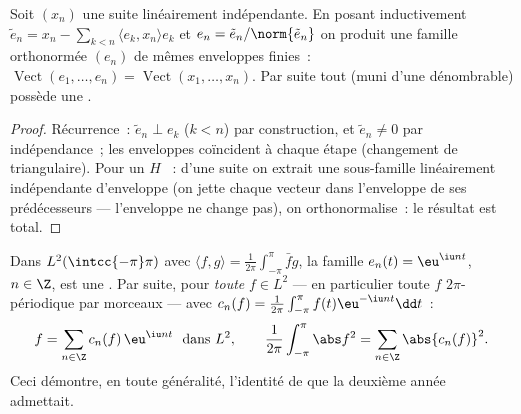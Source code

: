 \begin{proposition}\label{prop:b3:hilbert:gramschmidt}
Soit $(x_n)$ une suite linéairement indépendante. En posant
inductivement $\tilde e_n = x_n - \sum_{k<n}\langle e_k,
x_n\rangle e_k$ et $e_n = \tilde e_n/\norm{\tilde e_n}$ on
produit une famille orthonormée $(e_n)$ de mêmes enveloppes
finies~: $\operatorname{Vect}(e_1, \dots, e_n) =
\operatorname{Vect}(x_1, \dots, x_n)$. Par suite tout   (muni d'une  dénombrable)
possède une .
\end{proposition}

\begin{proof}
Récurrence~: $\tilde e_n \perp e_k$ ($k < n$) par
construction, et $\tilde e_n \neq 0$ par indépendance~; les
enveloppes coïncident à chaque étape (changement de 
triangulaire). Pour un $H$ ~: d'une suite  on
extrait une sous-famille linéairement indépendante d'enveloppe
 (on jette chaque vecteur dans l'enveloppe de ses
prédécesseurs --- l'enveloppe ne change pas), on
orthonormalise~: le résultat est total.
\end{proof}

\begin{theorem}
\label{thm:b3:hilbert:fourier}
Dans $L^2(\intcc{-\pi}\pi)$ avec $\langle f, g\rangle =
\frac1{2\pi}\int_{-\pi}^\pi \bar fg$, la famille $e_n(t) =
\eu^{\iu nt}$, $n \in \Z$, est une . Par
suite, pour \emph{toute} $f \in L^2$ --- en particulier toute
$f$ $2\pi$-périodique  par morceaux --- avec $c_n(f)
= \frac1{2\pi}\int_{-\pi}^{\pi}f(t)\eu^{-\iu nt}\dd t$~:
\[
f = \sum_{n\in\Z}c_n(f)\,\eu^{\iu nt} \ \ \text{dans } L^2,
\qquad
\frac1{2\pi}\int_{-\pi}^{\pi}\abs f^2 =
\sum_{n\in\Z}\abs{c_n(f)}^2 .
\]
Ceci démontre, en toute généralité, l'identité de 
que la deuxième année admettait.
\end{theorem}

